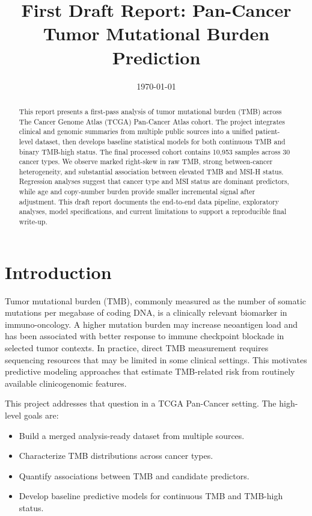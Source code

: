 \documentclass[11pt]{article}
\title{First Draft Report: Pan-Cancer Tumor Mutational Burden Prediction}
\author{}
\date{\today}
\begin{document}
\maketitle

\begin{abstract}
This report presents a first-pass analysis of tumor mutational burden (TMB) across The Cancer Genome Atlas (TCGA) Pan-Cancer Atlas cohort. The project integrates clinical and genomic summaries from multiple public sources into a unified patient-level dataset, then develops baseline statistical models for both continuous TMB and binary TMB-high status. The final processed cohort contains 10,953 samples across 30 cancer types. We observe marked right-skew in raw TMB, strong between-cancer heterogeneity, and substantial association between elevated TMB and MSI-H status. Regression analyses suggest that cancer type and MSI status are dominant predictors, while age and copy-number burden provide smaller incremental signal after adjustment. This draft report documents the end-to-end data pipeline, exploratory analyses, model specifications, and current limitations to support a reproducible final write-up.
\end{abstract}

\section{Introduction}

Tumor mutational burden (TMB), commonly measured as the number of somatic mutations per megabase of coding DNA, is a clinically relevant biomarker in immuno-oncology. A higher mutation burden may increase neoantigen load and has been associated with better response to immune checkpoint blockade in selected tumor contexts. In practice, direct TMB measurement requires sequencing resources that may be limited in some clinical settings. This motivates predictive modeling approaches that estimate TMB-related risk from routinely available clinicogenomic features.

This project addresses that question in a TCGA Pan-Cancer setting. The high-level goals are:
\begin{itemize}
    \item Build a merged analysis-ready dataset from multiple sources.
    \item Characterize TMB distributions across cancer types.
    \item Quantify associations between TMB and candidate predictors.
    \item Develop baseline predictive models for continuous TMB and TMB-high status.
\end{itemize}
\end{document}
